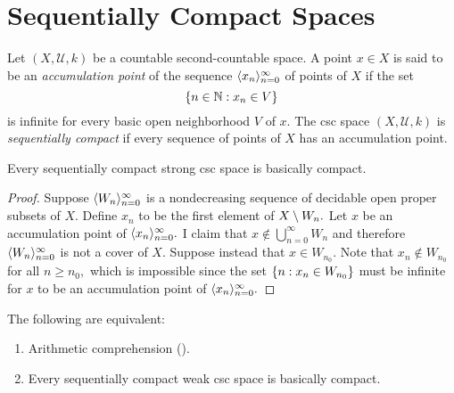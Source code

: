 \documentclass[csc]{subfiles}
\begin{document}
\section{Sequentially Compact Spaces}

Let \((X,\mathcal{U},k)\) be a countable second-countable space.
A point \(x \in X\) is said to be an \emph{accumulation point} of the sequence \(\langle x_n\rangle_{n=0}^\infty\) of points of \(X\) if the set \[\lbrace n \in \mathbb{N} : x_n \in V\rbrace\] is infinite for every basic open neighborhood \(V\) of \(x.\)
The csc space \((X,\mathcal{U},k)\) is \emph{sequentially compact} if every sequence of points of \(X\) has an accumulation point.

\begin{proposition}[\RCA]\label{P:SeqCompact>DCompact}
  Every sequentially compact strong csc space is basically compact.
\end{proposition}

\begin{proof}
  Suppose \(\langle W_n\rangle_{n=0}^\infty\) is a nondecreasing sequence of decidable open proper subsets of \(X.\)
  Define \(x_n\) to be the first element of \(X \setminus W_n.\)
  Let \(x\) be an accumulation point of \(\langle x_n\rangle_{n=0}^\infty.\)
  I claim that \(x \notin \bigcup_{n=0}^\infty W_n\) and therefore \(\langle W_n\rangle_{n=0}^\infty\) is not a cover of \(X.\)
  Suppose instead that \(x \in W_{n_0}.\)
  Note that \(x_n \notin W_{n_0}\) for all \(n \geq n_0,\) which is impossible since the set \(\lbrace n : x_n \in W_{n_0}\rbrace\) must be infinite for \(x\) to be an accumulation point of \(\langle x_n\rangle_{n=0}^\infty.\)
\end{proof}

\begin{theorem}
  The following are equivalent:
  \begin{enumerate}[\upshape(1)]
  \item Arithmetic comprehension \textup(\ACA\textup).
  \item Every sequentially compact weak csc space is basically compact.
  \end{enumerate}
\end{theorem}
\end{document}
